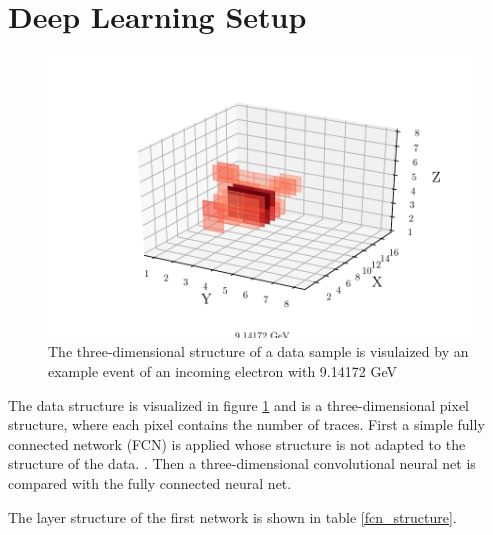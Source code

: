 \documentclass[12pt, a4paper]{thesis}
\begin{document}
\section{Deep Learning Setup}
\label{sec:orgb3e1899}

\begin{figure}[H]
  \centering
  \includegraphics[width=.9\linewidth]{../images/data_display.pdf}
  \caption{The three-dimensional structure of a data sample is
    visulaized by an example event of an incoming electron with
    9.14172 GeV}
  \label{data_display}
\end{figure}

The data structure is visualized in figure \ref{data_display} and is a
three-dimensional pixel structure, where each pixel contains the
number of traces. First a simple fully connected network (FCN) is
applied whose structure is not adapted to the structure of the
data. . Then a three-dimensional
convolutional neural net is compared with the fully connected neural
net.


  
 

The layer structure of the first network is shown in table \ref{fcn_structure}.
\end{document}
